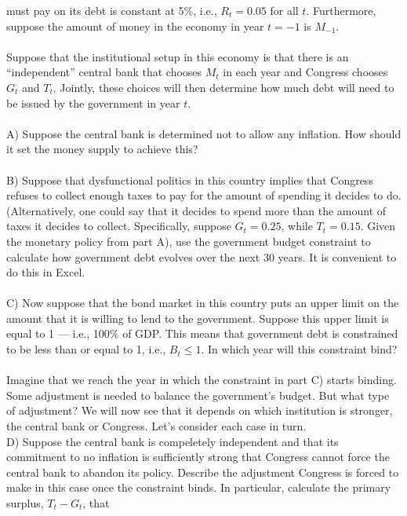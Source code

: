 \begin{homeworkProblem}[1]
    must pay on its debt is constant at 5\%, i.e., $R_t=0.05$ for all $t$. Furthermore,
    suppose the amount of money in the economy in year $t=-1$ is $M_{-1}$. 
    \\ \\
    Suppose that the institutional setup in this economy is that there is an 
    ``independent'' central bank that chooses $M_t$ in each year and Congress 
    chooses $G_t$ and $T_t$. Jointly, these choices will then determine how much 
    debt will need to be issued by the government in year $t$. 
    \\ \\
    A) Suppose the central bank is determined not to allow any inflation. How 
    should it set the money supply to achieve this?
    \\ \\
    B) Suppose that dysfunctional politics in this country implies that Congress 
    refuses to collect enough taxes to pay for the amount of spending it decides to 
    do. (Alternatively, one could say that it decides to spend more than the amount 
    of taxes it decides to collect. Specifically, suppose $G_t = 0.25$, while $T_t
    = 0.15$. Given the monetary policy from part A), use the government budget constraint
    to calculate how government debt evolves over the next 30 years. It is convenient
    to do this in Excel. 
    \\ \\
    C) Now suppose that the bond market in this country puts an upper limit on the amount
    that it is willing to lend to the government. Suppose this upper limit is equal to
    1 --- i.e., 100\% of GDP. This means that government debt is constrained to be less
    than or equal to 1, i.e., $B_t \leq 1$. In which year will this constraint bind?
    \\ \\
    Imagine that we reach the year in which the constraint in part C) starts binding. 
    Some adjustment is needed to balance the government's budget. But what type of 
    adjustment? We will now see that it depends on which institution is stronger, the
    central bank or Congress. Let's consider each case in turn. 
    \\
    D) Suppose the central bank is compeletely independent and that its commitment to no
    inflation is sufficiently strong that Congress cannot force the central bank to abandon
    its policy. Describe the adjustment Congress is forced to make in this case once the
    constraint binds. In particular, calculate the primary surplus, $T_t - G_t$, that 

\end{homeworkProblem}
